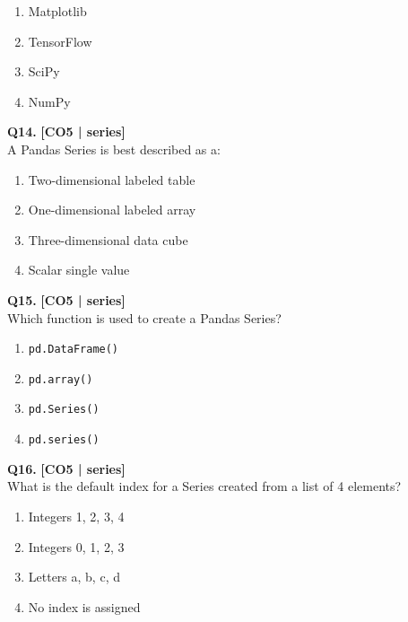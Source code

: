 \begin{enumerate}[label=(\alph*),topsep=2pt,itemsep=1pt,partopsep=0pt,parsep=0pt]
    \item \relax Matplotlib
    \item \relax TensorFlow
    \item \relax SciPy
    \item \relax NumPy
\end{enumerate}
\vspace{{2mm}}

\noindent\textbf{Q14.} \hfill {\small\color{LPUOrange}\textbf{[CO5 | series]}}\\[2pt]
A Pandas Series is best described as a:

\begin{enumerate}[label=(\alph*),topsep=2pt,itemsep=1pt,partopsep=0pt,parsep=0pt]
    \item \relax Two-dimensional labeled table
    \item \relax One-dimensional labeled array
    \item \relax Three-dimensional data cube
    \item \relax Scalar single value
\end{enumerate}
\vspace{{2mm}}

\noindent\textbf{Q15.} \hfill {\small\color{LPUOrange}\textbf{[CO5 | series]}}\\[2pt]
Which function is used to create a Pandas Series?

\begin{enumerate}[label=(\alph*),topsep=2pt,itemsep=1pt,partopsep=0pt,parsep=0pt]
    \item \relax \texttt{pd.DataFrame()}
    \item \relax \texttt{pd.array()}
    \item \relax \texttt{pd.Series()}
    \item \relax \texttt{pd.series()}
\end{enumerate}
\vspace{{2mm}}

\noindent\textbf{Q16.} \hfill {\small\color{LPUOrange}\textbf{[CO5 | series]}}\\[2pt]
What is the default index for a Series created from a list of 4 elements?

\begin{enumerate}[label=(\alph*),topsep=2pt,itemsep=1pt,partopsep=0pt,parsep=0pt]
    \item \relax Integers 1, 2, 3, 4
    \item \relax Integers 0, 1, 2, 3
    \item \relax Letters a, b, c, d
    \item \relax No index is assigned
\end{enumerate}
\vspace{{2mm}}


